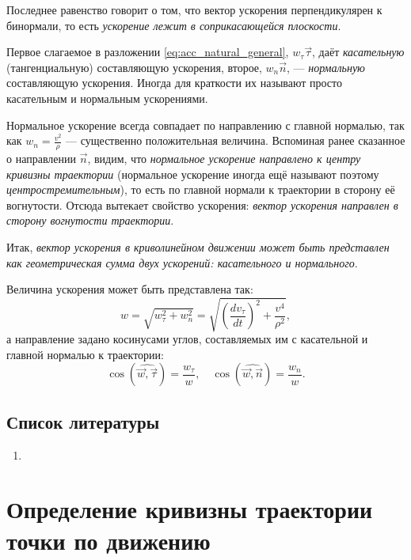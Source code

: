 \documentclass{article}
\theoremstyle{definition}
\theoremstyle{plain}
\theoremstyle{remark}
\numberwithin{equation}{section}
\newcommand{\paren}[1]{\left( #1 \right)}
\newcommand{\der}[2][]{\frac{d #1}{d #2}}
\newcommand{\dt}[1][]{\der[#1]{t}}
\begin{document}
Последнее равенство говорит о том, что вектор ускорения перпендикулярен к
бинормали, то есть \textit{ускорение лежит в соприкасающейся плоскости}.

Первое слагаемое в разложении \ref{eq:acc_natural_general}, $w_\tau \vec{\tau}$,
даёт \textit{касательную} (тангенциальную) составляющую ускорения, второе, $w_n
\vec{n}$, --- \textit{нормальную} составляющую ускорения. Иногда для краткости
их называют просто касательным и нормальным ускорениями.

Нормальное ускорение всегда совпадает по направлению с главной нормалью, так как
$w_n = \frac{v^2}{\rho}$ --- существенно положительная величина. Вспоминая ранее
сказанное о направлении $\vec{n}$, видим, что \textit{нормальное ускорение
направлено к центру кривизны траектории} (нормальное ускорение иногда ещё
называют поэтому \textit{центростремительным}), то есть по главной нормали к
траектории в сторону её вогнутости. Отсюда вытекает свойство ускорения:
\textit{вектор ускорения направлен в сторону вогнутости траектории}.

Итак, \textit{вектор ускорения в криволинейном движении может быть представлен
как геометрическая сумма двух ускорений: касательного и нормального}.

Величина ускорения может быть представлена так:
\begin{equation}
  w = \sqrt{w_\tau^2 + w_n^2} =
    \sqrt{\paren{\dt[v_\tau]}^2 + \frac{v^4}{\rho^2}},
\end{equation}
а направление задано косинусами углов, составляемых им с касательной и главной
нормалью к траектории:
\begin{equation}
  \cos(\widehat{\vec{w}, \vec{\tau}}) = \frac{w_\tau}{w}, \quad
  \cos(\widehat{\vec{w}, \vec{n}}) = \frac{w_n}{w}.
\end{equation}

\subsection{Список литературы}
\begin{enumerate}
  \item \cite{lourie}
\end{enumerate}

\pagebreak


\section{Определение кривизны траектории точки по движению}
\end{document}
